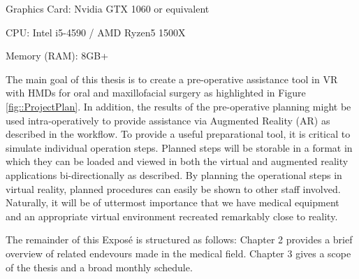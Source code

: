 \begin{compactenum}[label=(\alph*)]
    \item Graphics Card: Nvidia GTX 1060 or equivalent
    \item CPU: Intel i5-4590 / AMD Ryzen5 1500X
    \item Memory (RAM): 8GB+
\end{compactenum}

The main goal of this thesis is to create a pre-operative assistance tool in VR with HMDs for oral and maxillofacial surgery as highlighted in Figure \ref{fig::ProjectPlan}. 
In addition, the results of the pre-operative planning might be used intra-operatively to provide assistance via Augmented Reality (AR) as described in the workflow.
To provide a useful preparational tool, it is critical to simulate individual operation steps.
Planned steps will be storable in a format in which they can be loaded and viewed in both the virtual and augmented reality applications bi-directionally as described.
By planning the operational steps in virtual reality, planned procedures can easily be shown to other staff involved.
Naturally, it will be of uttermost importance that we have medical equipment and an appropriate virtual environment recreated remarkably close to reality.

The remainder of this Exposé is structured as follows: Chapter 2 provides a brief overview of related endevours made in the medical field.
Chapter 3 gives a scope of the thesis and a broad monthly schedule.